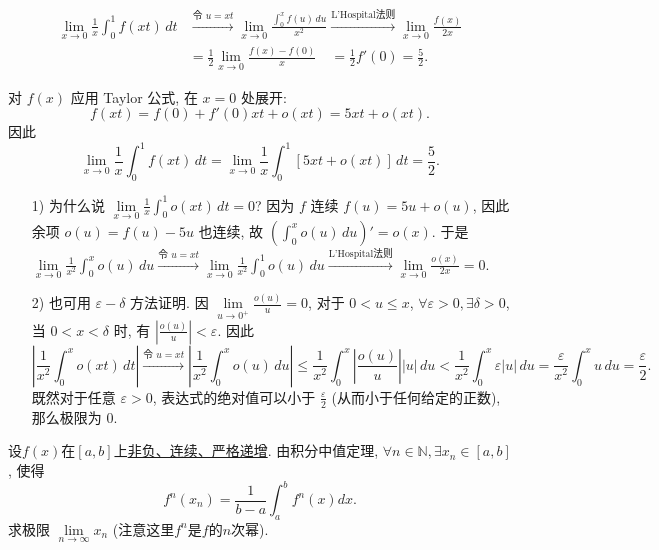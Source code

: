 \documentclass[lang=cn,newtx,10pt,scheme=chinese]{elegantbook}
\begin{document}
\begin{solution}[解 I]
\begin{align*} \lim\limits_{x \to 0} \frac{1}{x} \int_0^1 f(xt) \,dt &\xrightarrow{\text{令 } u=xt} \lim\limits_{x \to 0} \frac{\int_0^x f(u) \,du}{x^2} \xrightarrow{\text{L'Hospital法则}} \lim\limits_{x \to 0} \frac{f(x)}{2x} \\ &= \frac{1}{2} \lim\limits_{x \to 0} \frac{f(x)-f(0)}{x} \quad = \frac{1}{2} f'(0) = \frac{5}{2}. \end{align*}
\end{solution}

\begin{solution}[解 II]
对 $f(x)$ 应用 Taylor 公式, 在 $x=0$ 处展开:
$$ f(xt) = f(0) + f'(0)xt + o(xt) = 5xt + o(xt) . $$
因此
$$ \lim\limits_{x \to 0} \frac{1}{x} \int_0^1 f(xt) \,dt = \lim\limits_{x \to 0} \frac{1}{x} \int_0^1 [5xt + o(xt)] \,dt = \frac{5}{2}. $$
\end{solution}
\begin{remark}
\begin{enumerate}
    \item[1)] 为什么说 $\lim\limits_{x \to 0} \frac{1}{x} \int_0^1 o(xt) \,dt = 0$? 因为 $f$ 连续 $f(u)=5u+o(u)$, 因此余项 $o(u) = f(u)-5u$ 也连续, 故 $\left(\int_0^x o(u) \,du\right)' = o(x)$. 于是 $\lim\limits_{x \to 0} \frac{1}{x^2} \int_0^x o(u) \,du \xrightarrow{\text{令 } u=xt} \lim\limits_{x \to 0} \frac{1}{x^2} \int_0^1 o(u) \,du \xrightarrow{\text{L'Hospital法则}} \lim\limits_{x \to 0} \frac{o(x)}{2x} = 0$.

    \item[2)] 也可用 $\varepsilon-\delta$ 方法证明. 因 $\lim\limits_{u \to 0^+} \frac{o(u)}{u} = 0$, 对于 $0<u \leq x$, $\forall \varepsilon > 0, \exists \delta > 0$, 当 $0 < x < \delta$ 时, 有 $\left|\frac{o(u)}{u}\right| < \varepsilon$. 因此
    $$ \left| \frac{1}{x^2} \int_0^x o(xt) \,dt \right| \xrightarrow{\text{令 } u=xt} \left| \frac{1}{x^2} \int_0^x o(u) \,du \right| \leq \frac{1}{x^2} \int_0^x \left| \frac{o(u)}{u} \right| |u| \,du < \frac{1}{x^2} \int_0^x \varepsilon |u| \,du = \frac{\varepsilon}{x^2} \int_0^x u \,du = \frac{\varepsilon}{2}. $$既然对于任意 $\varepsilon > 0$, 表达式的绝对值可以小于 $\frac{\varepsilon}{2}$ (从而小于任何给定的正数), 那么极限为 $0$.
\end{enumerate}
\end{remark}


\begin{example}[(难难)]
设$f(x)$在$[a,b]$上\underline{非负、连续、严格递增}. 由积分中值定理, $\forall n \in \mathbb{N}, \exists x_n \in [a,b]$, 使得
$$ f^n(x_n) = \frac{1}{b-a} \int_{a}^{b} f^n(x) dx. $$
求极限 $\lim\limits_{n \to \infty} x_n$ (注意这里$f^n$是$f$的$n$次幂).
\end{example}
\end{document}
